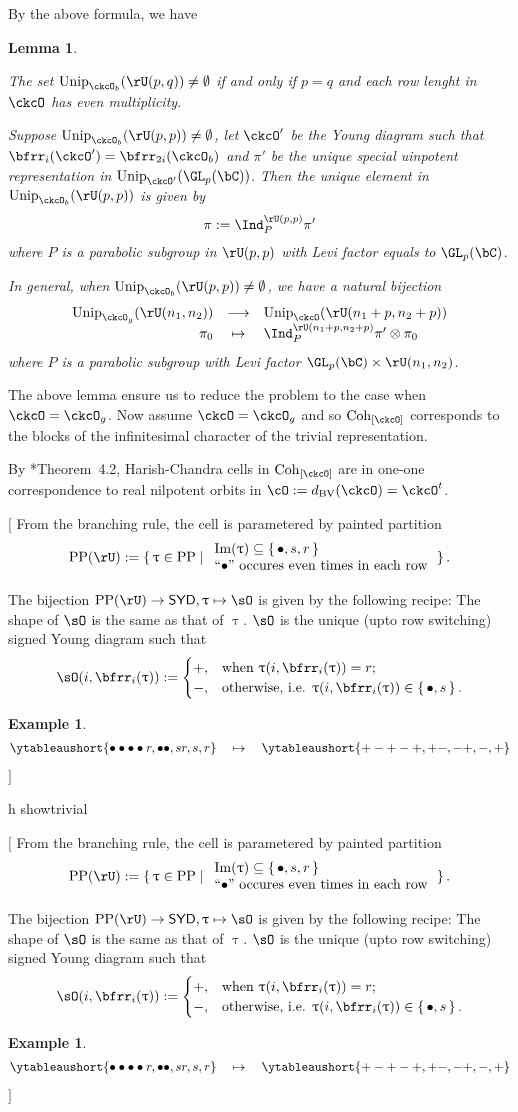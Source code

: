 \documentclass[12pt,a4paper]{amsart}
\let\ytb=\ytableaushort
\newcommand{\trivial}[2][]{\if\relax\detokenize{#1}\relax
  {%
      \color{orange} \vspace{0em} $[$  #2 $]$
      \color{black}
  }
  \else
\ifx#1h
\ifcsname showtrivial\endcsname
{%
    \color{orange} \vspace{0em}  $[$ #2 $]$
    \color{black}
}
\fi
\else {\red Wrong argument!} \fi
\fi
}
\def\Im{\operatorname{Im}}
\numberwithin{equation}{section}
\newtheorem{lem}[thm]{Lemma}
\newtheorem{eg}[thm]{Example}
\theoremstyle{remark}
\def\Unip{\mathrm{Unip}}
\def\dBV{d_{\mathrm{BV}}}
\def\SYD{\mathsf{SYD}}
\def\Cint#1{\Coh_{[#1]}}
\def\PP{\mathrm{PP}}
\def\Im{\mathrm{Im}}
\def\Coh{\mathrm{Coh}}
\begin{document}
By the above formula, we have
\begin{lem}
  \begin{enumT}
    \item
The set $\Unip_{\ckcO_b}(\rU(p,q))\neq \emptyset$ if and only if $p=q$ and 
each row lenght in $\ckcO$ has even multiplicity.
\item
Suppose $\Unip_{\ckcO_b}(\rU(p,p))\neq \emptyset$, let $\ckcO'$ be the Young diagram 
such that $\bfrr_i(\ckcO') = \bfrr_{2i}(\ckcO_b)$ and $\pi'$ be the unique special 
uinpotent representation in $\Unip_{\ckcO'}(\GL_{p}(\bC))$. 
Then the unique element in $\Unip_{\ckcO_b}(\rU(p,p))$  is given by 
\[
  \pi := \Ind_{P}^{\rU(p,p)} \pi'
\]
where $P$ is a parabolic subgroup in $\rU(p,p)$ with Levi factor equals
to $\GL_p(\bC)$.
\item 
In general, when $\Unip_{\ckcO_b}(\rU(p,p))\neq \emptyset$, we have a natural bijection 
\[  
  \begin{array}{rcl}
  \Unip_{\ckcO_g}(\rU(n_1,n_2)) &\longrightarrow& \Unip_{\ckcO}(\rU(n_1+p,n_2+p))\\
  \pi_0 & \mapsto & \Ind_P^{\rU(n_1+p,n_2+p)} \pi'\otimes \pi_0
  \end{array}
\]
where $P$ is a parabolic subgroup with Levi factor $\GL_p(\bC)\times \rU(n_1,n_2)$. 
  \end{enumT}
\end{lem}

The above lemma ensure us to reduce the problem to the case when $\ckcO = \ckcO_g$. 
Now assume $\ckcO = \ckcO_g$ and so $\Cint{\ckcO}$ corresponds to the blocks of 
the infinitesimal character of the trivial representation.   

By \cite{BV.W}*{Theorem~4.2},  Harish-Chandra cells in $\Cint{\ckcO}$ are in one-one
correspondence to real nilpotent orbits in $\cO:=\dBV(\ckcO)=\ckcO^t$. 

\trivial{
From the branching rule, the cell is parametered by painted partition 
\[
\PP{}(\rU):=\set{\uptau\in \PP{}| \begin{array}{l}\Im (\uptau) \subseteq  \set{\bullet, s,r}\\
  \text{``$\bullet$'' occures even times in each row}
\end{array} 
  }.  
\]

The bijection $\PP{}(\rU)\rightarrow \SYD, \uptau\mapsto \sO$ is given by the following recipe:
The shape of $\sO$ is the same as that of $\uptau$. 
$\sO$ is the unique (upto row switching) signed Young diagram such that
\[
  \sO(i,\bfrr_i(\uptau)) := \begin{cases}
    +,  & \text{when }\uptau(i,\bfrr_i(\uptau))=r;\\
    -,  & \text{otherwise, i.e. }\uptau(i,\bfrr_i(\uptau))\in \set{\bullet,s}.
  \end{cases}
\] 

\begin{eg}
  \[
 \ytb{\bullet\bullet\bullet\bullet r,\bullet\bullet , sr,s,r}   
 \quad
 \mapsto\quad
 \ytb{+-+-+,+-, -+,-,+}   
  \]
\end{eg}
}
\end{document}
